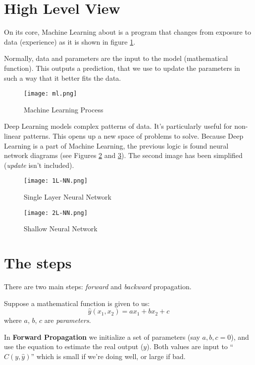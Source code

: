 \section{High Level View}

On its core, Machine Learning about is a program that changes from exposure to data (experience) as it is shown in figure \ref{fig:learn}.

Normally, data and parameters are the input to the model (mathematical function). This outputs a prediction, that we use to update the parameters in such a way that it better fits the data.

\begin{figure}[h]
 \centering
 \texttt{[image: ml.png]}
  \caption{Machine Learning Process}\label{fig:learn}
\end{figure}

Deep Learning models complex patterns of data. It's particularly useful for non-linear patterns. This opens up a new space of problems to solve. Because Deep Learning is a part of Machine Learning, the previous logic is found neural network diagrams (see Figures \ref{fig:single} and \ref{fig:shallow}). The second image has been simplified (\textit{update} isn't included).

\begin{figure}
 \centering
 \texttt{[image: 1L-NN.png]}
 \caption{Single Layer Neural Network}
 \label{fig:single}
\end{figure}


\begin{figure}
 \centering
 \texttt{[image: 2L-NN.png]}
 \caption{Shallow Neural Network}
 \label{fig:shallow}
\end{figure}

\section{The steps}
There are two main steps: \textit{forward} and \textit{backward} propagation. 

Suppose a mathematical function is given to us:
$$ \hat{y}(x_1,x_2) = a x_1 + b x_2 + c$$
where $a$, $b$, $c$ are \textit{parameters}.

In \textbf{Forward Propagation} we initialize a set of parameters (say $a,b,c=0$), and use the equation to estimate the real output ($y$). Both values are input to ``$C(y, \hat{y})$'' which is small if we're doing well, or large if bad. 

